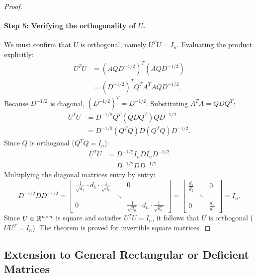 \begin{proof}
\paragraph{Step 5: Verifying the orthogonality of $U$.}
We must confirm that $U$ is orthogonal, namely $U^T U = I_n$.
Evaluating the product explicitly:
\begin{align}
    U^T U &= \left( A Q D^{-1/2} \right)^T \left( A Q D^{-1/2} \right) \nonumber \\
          &= \left( D^{-1/2} \right)^T Q^T A^T A Q D^{-1/2}.
\end{align}
Because $D^{-1/2}$ is diagonal, $(D^{-1/2})^T = D^{-1/2}$. Substituting $A^T A = Q D Q^T$:
\begin{align}
    U^T U &= D^{-1/2} Q^T (Q D Q^T) Q D^{-1/2} \nonumber \\
          &= D^{-1/2} (Q^T Q) D (Q^T Q) D^{-1/2}.
\end{align}
Since $Q$ is orthogonal ($Q^T Q = I_n$):
\begin{align}
    U^T U &= D^{-1/2} I_n D I_n D^{-1/2} \nonumber \\
          &= D^{-1/2} D D^{-1/2}.
\end{align}
Multiplying the diagonal matrices entry by entry:
\begin{equation}
    D^{-1/2} D D^{-1/2} = \begin{bmatrix}
        \frac{1}{\sqrt{d_1}} \cdot d_1 \cdot \frac{1}{\sqrt{d_1}} & & 0 \\
        & \ddots & \\
        0 & & \frac{1}{\sqrt{d_n}} \cdot d_n \cdot \frac{1}{\sqrt{d_n}}
    \end{bmatrix} = \begin{bmatrix}
        \frac{d_1}{d_1} & & 0 \\
        & \ddots & \\
        0 & & \frac{d_n}{d_n}
    \end{bmatrix} = I_n.
\end{equation}
Since $U \in \mathbb{R}^{n \times n}$ is square and satisfies $U^T U = I_n$, it follows that $U$ is orthogonal ($U U^T = I_n$). The theorem is proved for invertible square matrices.
\end{proof}

\subsection{Extension to General Rectangular or Deficient Matrices}

